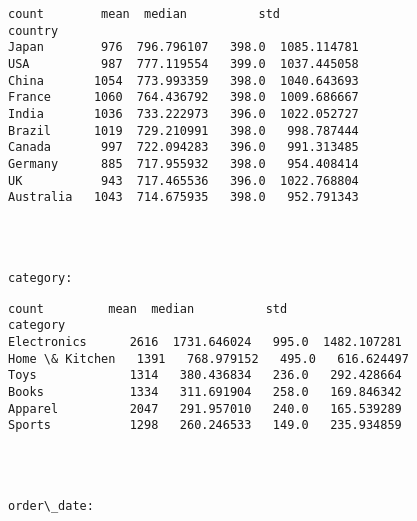 \documentclass[11pt]{article}
\begin{document}
    
    \begin{Verbatim}[commandchars=\\\{\}]
           count        mean  median          std
country                                          
Japan        976  796.796107   398.0  1085.114781
USA          987  777.119554   399.0  1037.445058
China       1054  773.993359   398.0  1040.643693
France      1060  764.436792   398.0  1009.686667
India       1036  733.222973   396.0  1022.052727
Brazil      1019  729.210991   398.0   998.787444
Canada       997  722.094283   396.0   991.313485
Germany      885  717.955932   398.0   954.408414
UK           943  717.465536   396.0  1022.768804
Australia   1043  714.675935   398.0   952.791343
    \end{Verbatim}

    
    \begin{center}
    \end{center}
    { \hspace*{\fill} \\}
    
    \begin{Verbatim}[commandchars=\\\{\}]

category:
    \end{Verbatim}

    
    \begin{Verbatim}[commandchars=\\\{\}]
                count         mean  median          std
category                                               
Electronics      2616  1731.646024   995.0  1482.107281
Home \& Kitchen   1391   768.979152   495.0   616.624497
Toys             1314   380.436834   236.0   292.428664
Books            1334   311.691904   258.0   169.846342
Apparel          2047   291.957010   240.0   165.539289
Sports           1298   260.246533   149.0   235.934859
    \end{Verbatim}

    
    \begin{center}
    \end{center}
    { \hspace*{\fill} \\}
    
    \begin{Verbatim}[commandchars=\\\{\}]

order\_date:
    \end{Verbatim}
\end{document}
